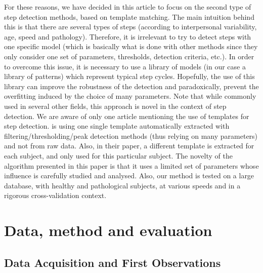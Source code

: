 \documentclass[../thesis.tex]{subfiles}
\begin{document}
For these reasons, we have decided in this article to focus on the second type of step detection methods, based on template matching. The main intuition behind this is that there are several types of steps (according to interpersonal variability, age, speed and pathology). Therefore, it is irrelevant to try to detect steps with one specific model (which is basically what is done with other methods since they only consider one set of parameters, thresholds, detection criteria, etc.). In order to overcome this issue, it is necessary to use a library of models (in our case  a library of patterns) which represent typical step cycles. Hopefully, the use of this library can improve the robustness of the detection and paradoxically, prevent the overfitting induced by the choice of many parameters. Note that while commonly used in several other fields, this approach is novel in the context of step detection. We are aware of only one article mentioning the use of templates for step detection. \citet{ying2007automatic} is using  one single template automatically extracted with filtering/thresholding/peak detection methods (thus relying on many parameters) and not from raw data. Also, in their paper, a different template is extracted for each subject, and only used for this particular subject. The novelty of the algorithm presented in this paper is that it uses a limited set of parameters whose influence is carefully studied and analysed. Also, our method is tested on a large database, with healthy and pathological subjects, at various speeds and in a rigorous cross-validation context.




\section{Data, method and evaluation}
\label{sec:walk_sd:method}

\subsection{Data Acquisition and First Observations}
\end{document}
